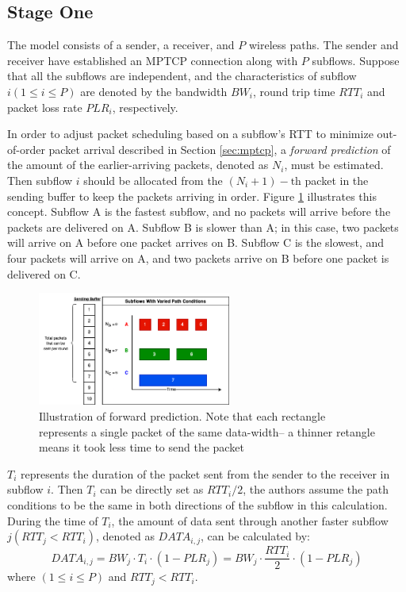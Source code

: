 \documentclass[sigplan,screen,nonacm]{acmart}
\begin{document}
\subsection{Stage One}
\label{sub:stage-one}
The model consists of a sender, a receiver, and $P$ wireless paths. The sender and receiver have established an MPTCP connection along with $P$ subflows. Suppose that all the subflows are independent, and the characteristics of subflow $i(1 \le i \le P)$ are denoted by the bandwidth $BW_i$, round trip time $RTT_i$ and packet loss rate $PLR_i$, respectively.

In order to adjust packet scheduling based on a subflow’s RTT to minimize out-of-order packet arrival described in Section \ref{sec:mptcp}, a \emph{forward prediction} of the amount of the earlier-arriving packets, denoted as $N_i$, must be estimated. Then subflow $i$ should be allocated from the $(N_{i}+1)-\mathrm{th}$ packet in the sending buffer to keep the packets arriving in order. Figure \ref{fig:subflow_varied} illustrates this concept. Subflow A is the fastest subflow, and no packets will arrive before the packets are delivered on A. Subflow B is slower than A; in this case, two packets will arrive on A before one packet arrives on B. Subflow C is the slowest, and four packets will arrive on A, and two packets arrive on B before one packet is delivered on C.

\begin{figure}
\includegraphics[width=2.5in]{mptcp_paper/assets/subflow_varied.png}
\caption{Illustration of forward prediction. Note that each rectangle represents a single packet of the same data-width-- a thinner retangle means it took less time to send the packet}
\label{fig:subflow_varied}
\end{figure}

$T_i$ represents the duration of the packet sent from the sender to the receiver in subflow $i$. Then $T_i$ can be directly set as $RTT_i/2$, the authors assume the path conditions to be the same in both directions of the subflow in this calculation. During the time of $T_i$, the amount of data sent through another faster subflow $j(RTT_j<RTT_i)$, denoted as $DATA_{i,j}$, can be calculated by:
\begin{equation*} 
DATA_{i,j}=BW_{j}\cdot T_{i}\cdot(1-PLR_{j})=BW_{j}\cdot\frac{RTT_{i}}{2}\cdot(1-PLR_{j})
    \tag{1}
    \label{eq:stage-one-1}
\end{equation*}
where $(1 \le i \le P)$ and $RTT_j<RTT_i$.
\end{document}
